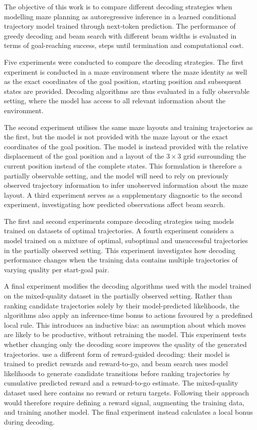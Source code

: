﻿\documentclass[12pt,a4paper]{article}
\theoremstyle{definition}
\begin{document}
The objective of this work is to compare different decoding strategies when 
modelling maze planning as autoregressive inference in a learned conditional 
trajectory model trained through next-token prediction. The performance of 
greedy decoding and beam search with different beam widths is evaluated in terms of 
goal-reaching success, steps until termination and computational cost.

Five experiments were conducted to compare the decoding strategies.
The first experiment is conducted in a maze environment where the maze
identity as well as the exact coordinates of the goal position, starting position and subsequent
states are provided. Decoding algorithms are thus evaluated in a fully observable setting, where the 
model has access to all relevant information about the environment.

The second experiment utilises the same maze layouts and training trajectories as the
first, but the model is not provided with the maze layout or the exact coordinates of 
the goal position. The model is instead provided with the relative displacement of the 
goal position and a layout of the $3 \times 3$ grid surrounding the current position instead of the 
complete states.
This formulation is therefore a partially observable setting, and the model will 
need to rely on previously observed trajectory information to infer unobserved 
information about the maze layout.
A third experiment serves as a supplementary diagnostic to the second experiment,
investigating how predicted observations affect beam search.

The first and second experiments compare decoding strategies using models trained on
datasets of optimal trajectories. A fourth experiment considers a model trained on a mixture
of optimal, suboptimal and unsuccessful trajectories in the partially observed setting. This
experiment investigates how decoding performance changes when the training data
contains multiple trajectories of varying quality per start-goal pair.

A final experiment modifies the decoding algorithms used with the model trained on the mixed-quality
dataset in the partially observed setting. Rather than ranking candidate trajectories solely by their
model-predicted likelihoods, the algorithms also apply an inference-time bonus to actions favoured by
a predefined local rule. This introduces an inductive bias: an assumption about which moves are likely
to be productive, without retraining the model. This experiment tests whether changing only the decoding
score improves the quality of the generated trajectories. \citet{janner2021trajectory} use a different form of
reward-guided decoding: their model is trained to predict rewards and reward-to-go, and beam search
uses model likelihoods to generate candidate transitions before ranking trajectories by cumulative
predicted reward and a reward-to-go estimate. The mixed-quality dataset
used here contains no reward or return targets. Following their approach would therefore require
defining a reward signal, augmenting the training data, and training another model. The final
experiment instead calculates a local bonus during decoding.
\end{document}
